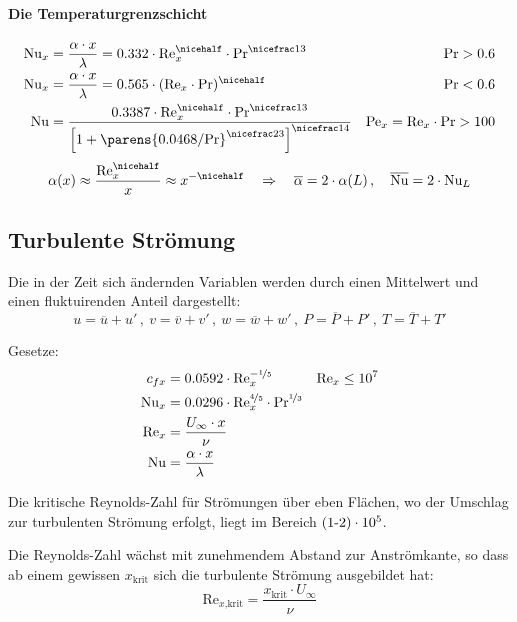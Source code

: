 		\paragraph{Die Temperaturgrenzschicht} %
			\begin{align*}
				\mathrm{Nu}_x &= \frac{\alpha \cdot x}{\lambda} = 0.332 \cdot \mathrm{Re}_x^{\nicehalf} \cdot \mathrm{Pr}^{\nicefrac 1 3} & \mathrm{Pr} > 0.6 \\
				\mathrm{Nu}_x &= \frac{\alpha \cdot x}{\lambda} = 0.565 \cdot (\mathrm{Re}_x\vphantom{1^2} \cdot \mathrm{Pr})^{\nicehalf} & \mathrm{Pr} < 0.6 \\
				\mathrm{Nu} &= \frac{0.3387 \cdot \mathrm{Re}_x^{\nicehalf} \cdot \mathrm{Pr}^{\nicefrac 1 3}}{\left[
					1 + \parens{
						0.0468 / \mathrm{Pr}
					}^{\nicefrac 2 3}
				\right]^{\nicefrac 1 4}} & \mathrm{Pe}_x = \mathrm{Re}_x \cdot \mathrm{Pr} > 100
			\end{align*}
			\[
				\alpha(x) \approx \frac{\mathrm{Re}_x^{\nicehalf}}{x} \approx x^{-\nicehalf} \quad \Rightarrow \quad \overline\alpha = 2 \cdot \alpha(L)\,,\quad \overline{\mathrm{Nu}} = 2 \cdot \mathrm{Nu}_L
			\]

	\subsection{Turbulente Strömung} %
		Die in der Zeit sich ändernden Variablen werden durch einen Mittelwert und einen fluktuirenden Anteil dargestellt:
		\[
			u = \overline u + u'\,,\ v = \overline v + v'\,,\ w = \overline w + w'\,,\ P = \overline P + P'\,,\ T = \overline T + T'
		\]

		Gesetze:
		\begin{align*}
			c_{fx} &= 0.0592 \cdot \mathrm{Re}_x^{-\nicefrac 1 5} & \mathrm{Re}_x \le 10^7 \\
			\mathrm{Nu}_x &= 0.0296 \cdot \mathrm{Re}_x^{\nicefrac 4 5} \cdot \mathrm{Pr}^{\nicefrac 1 3} \\
			\mathrm{Re}_x &= \frac{U_\infty \cdot x}{\nu} \\
			\mathrm{Nu} &= \frac{\alpha \cdot x}{\lambda}
		\end{align*}

		Die kritische Reynolds-Zahl für Strömungen über eben Flächen, wo der Umschlag zur turbulenten Strömung erfolgt, liegt im Bereich $(1\text-2)\cdot 10^5$.

		Die Reynolds-Zahl wächst mit zunehmendem Abstand zur Anströmkante, so dass ab einem gewissen $x_\text{krit}$ sich die turbulente Strömung ausgebildet hat:
		\[
			\mathrm{Re}_{x\text{,krit}} = \frac{x_\text{krit} \cdot U_\infty}{\nu}
		\]

